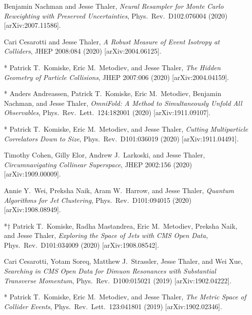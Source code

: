 \begin{list}{[]\addtocounter{jessecount}{-1}}{\leftmargin=3em \itemsep=4pt}
\item
 Benjamin Nachman and Jesse Thaler,
\emph{Neural Resampler for Monte Carlo Reweighting with Preserved Uncertainties},
Phys.\ Rev.\ D102.076004 (2020)
[arXiv:2007.11586].

\item
 Cari Cesarotti and Jesse Thaler,
\emph{A Robust Measure of Event Isotropy at Colliders},
JHEP 2008:084 (2020)
[arXiv:2004.06125].

\item
* Patrick T.\ Komiske, Eric M.\ Metodiev, and Jesse Thaler,
\emph{The Hidden Geometry of Particle Collisions},
JHEP 2007:006 (2020)
[arXiv:2004.04159].

\item
* Anders Andreassen, Patrick T.\ Komiske, Eric M.\ Metodiev, Benjamin Nachman, and Jesse Thaler,
\emph{OmniFold: A Method to Simultaneously Unfold All Observables},
Phys.\ Rev.\ Lett.\ 124:182001 (2020)
[arXiv:1911.09107].

\item
* Patrick T.\ Komiske, Eric M.\ Metodiev, and Jesse Thaler,
\emph{Cutting Multiparticle Correlators Down to Size},
Phys.\ Rev.\ D101:036019 (2020)
[arXiv:1911.04491].

\item
 Timothy Cohen, Gilly Elor, Andrew J.\ Larkoski, and Jesse Thaler,
\emph{Circumnavigating Collinear Superspace},
JHEP 2002:156 (2020)
[arXiv:1909.00009].

\item
 Annie Y.\ Wei, Preksha Naik, Aram W.\ Harrow, and Jesse Thaler,
\emph{Quantum Algorithms for Jet Clustering},
Phys.\ Rev.\ D101:094015 (2020)
[arXiv:1908.08949].

\item
*$\dagger$ Patrick T.\ Komiske, Radha Mastandrea, Eric M.\ Metodiev, Preksha Naik, and Jesse Thaler,
\emph{Exploring the Space of Jets with CMS Open Data},
Phys.\ Rev.\ D101:034009 (2020)
[arXiv:1908.08542].

\item
 Cari Cesarotti, Yotam Soreq, Matthew J.\ Strassler, Jesse Thaler, and Wei Xue,
\emph{Searching in CMS Open Data for Dimuon Resonances with Substantial Transverse Momentum},
Phys.\ Rev.\ D100:015021 (2019)
[arXiv:1902.04222].

\item
* Patrick T.\ Komiske, Eric M.\ Metodiev, and Jesse Thaler,
\emph{The Metric Space of Collider Events},
Phys.\ Rev.\ Lett.\ 123:041801 (2019)
[arXiv:1902.02346].


\end{list}
